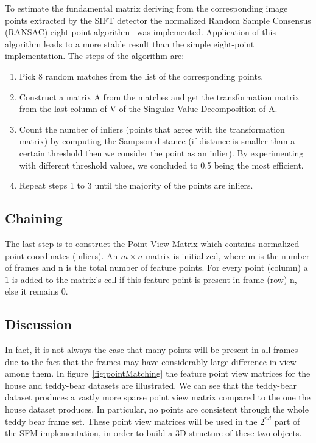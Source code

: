 To estimate the fundamental matrix deriving from the corresponding image points extracted by the SIFT detector the normalized Random Sample Consensus (RANSAC) eight-point algorithm~\cite{eight-point} was implemented. Application of this algorithm leads to a more stable result than the simple eight-point implementation. The steps of the algorithm are:

\begin{enumerate}[1]
  \item Pick 8 random matches from the list of the corresponding points.
  \item Construct a matrix A from the matches and get the transformation matrix from the last column of V of the Singular Value Decomposition of A.
  \item Count the number of inliers (points that agree with the transformation matrix) by computing the Sampson distance (if distance is smaller than a certain threshold then we consider the point as an inlier). By experimenting with different threshold values, we concluded to 0.5 being the most efficient.
  \item Repeat steps 1 to 3 until the majority of the points are inliers.
\end{enumerate}


\subsection{Chaining}
The last step is to construct the Point View Matrix which contains normalized point coordinates (inliers). An $m \times n$ matrix is initialized, where m is the number of frames and n is the total number of feature points. For every point (column) a $1$ is added to the matrix's cell if this feature point is present in frame (row) n, else it remains $0$.

\subsection{Discussion}
In fact, it is not always the case that many points will be present in all frames due to the fact that the frames may have considerably large difference in view among them. In figure~\ref{fig:pointMatching} the feature point view matrices for the house and teddy-bear datasets are illustrated. We can see that the teddy-bear dataset produces a vastly more sparse point view matrix compared to the one the house dataset produces. In particular, no points are consistent through the whole teddy bear frame set. These point view matrices will be used in the $2^{nd}$ part of the SFM implementation, in order to build a 3D structure of these two objects.


